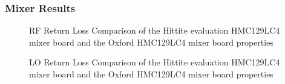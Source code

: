\subsubsection{Mixer Results}
\label{sec:mixerResults}
\begin{figure}[ht]
 \centering
{}
\hspace{0.1cm}
 \caption{RF Return Loss Comparison of the Hittite evaluation HMC129LC4 mixer board and the Oxford HMC129LC4 mixer board properties}
\end{figure}
\begin{figure}
\centering
{}
\hspace{0.1cm}
\caption{LO Return Loss Comparison of the Hittite evaluation HMC129LC4 mixer board and the Oxford HMC129LC4 mixer board properties}
\end{figure}
